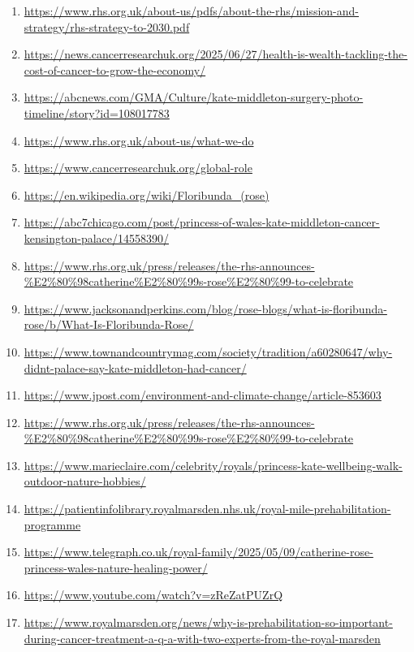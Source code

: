 \documentclass[10pt,a4paper]{article}
\begin{document}
\begin{enumerate}[leftmargin=*]
            \item \url{ https://www.rhs.org.uk/about-us/pdfs/about-the-rhs/mission-and-strategy/rhs-strategy-to-2030.pdf }
            \item \url{ https://news.cancerresearchuk.org/2025/06/27/health-is-wealth-tackling-the-cost-of-cancer-to-grow-the-economy/ }
            \item \url{ https://abcnews.com/GMA/Culture/kate-middleton-surgery-photo-timeline/story?id=108017783 }
            \item \url{ https://www.rhs.org.uk/about-us/what-we-do }
            \item \url{ https://www.cancerresearchuk.org/global-role }
            \item \url{ https://en.wikipedia.org/wiki/Floribunda\_(rose) }
            \item \url{ https://abc7chicago.com/post/princess-of-wales-kate-middleton-cancer-kensington-palace/14558390/ }
            \item \url{ https://www.rhs.org.uk/press/releases/the-rhs-announces-\%E2\%80\%98catherine\%E2\%80\%99s-rose\%E2\%80\%99-to-celebrate }
            \item \url{ https://www.jacksonandperkins.com/blog/rose-blogs/what-is-floribunda-rose/b/What-Is-Floribunda-Rose/ }
            \item \url{ https://www.townandcountrymag.com/society/tradition/a60280647/why-didnt-palace-say-kate-middleton-had-cancer/ }
            \item \url{ https://www.jpost.com/environment-and-climate-change/article-853603 }
            \item \url{ https://www.rhs.org.uk/press/releases/the-rhs-announces-\%E2\%80\%98catherine\%E2\%80\%99s-rose\%E2\%80\%99-to-celebrate }
            \item \url{ https://www.marieclaire.com/celebrity/royals/princess-kate-wellbeing-walk-outdoor-nature-hobbies/ }
            \item \url{ https://patientinfolibrary.royalmarsden.nhs.uk/royal-mile-prehabilitation-programme }
            \item \url{ https://www.telegraph.co.uk/royal-family/2025/05/09/catherine-rose-princess-wales-nature-healing-power/ }
            \item \url{ https://www.youtube.com/watch?v=zReZatPUZrQ }
            \item \url{ https://www.royalmarsden.org/news/why-is-prehabilitation-so-important-during-cancer-treatment-a-q-a-with-two-experts-from-the-royal-marsden }

\end{enumerate}
\end{document}
